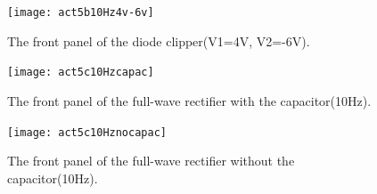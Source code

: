 \documentclass[11pt]{article}
\begin{document}
\begin{figure}[H]
 \begin{center}
  \texttt{[image: act5b10Hz4v-6v]}
  \caption{The front panel of the diode clipper(V1=4V, V2=-6V).}
  \label{fig:act5b10Hz4v-6v}
 \end{center}
\end{figure}

\begin{figure}[H]
 \begin{center}
  \texttt{[image: act5c10Hzcapac]}
  \caption{The front panel of the full-wave rectifier with the capacitor(10Hz).}
  \label{fig:act5c10Hzcapac}
 \end{center}
\end{figure}

\begin{figure}[H]
 \begin{center}
  \texttt{[image: act5c10Hznocapac]}
  \caption{The front panel of the full-wave rectifier without the capacitor(10Hz).}
  \label{fig:act5c10Hznocapac}
 \end{center}
\end{figure}
\end{document}
